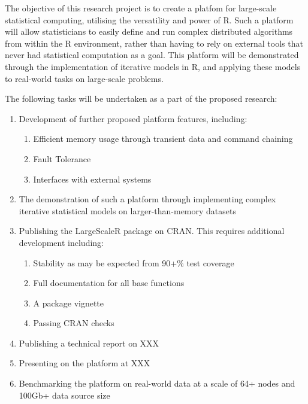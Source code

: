 The objective of this research project is to create a platfom for large-scale statistical computing, utilising the versatility and power of R.
Such a platform will allow statisticians to easily define and run complex distributed algorithms from within the R environment, rather than having to rely on external tools that never had statistical computation as a goal.
This platform will be demonstrated through the implementation of iterative models in R, and applying these models to real-world tasks on large-scale problems.

The following tasks will be undertaken as a part of the proposed research:

\begin{enumerate}
        \item Development of further proposed platform features, including:
                \begin{enumerate}
                        \item Efficient memory usage through transient data and command chaining
                        \item Fault Tolerance
                        \item Interfaces with external systems
                \end{enumerate}
        \item The demonstration of such a platform through implementing complex iterative statistical models on larger-than-memory datasets
        \item Publishing the LargeScaleR package on CRAN. This requires additional development including:
                \begin{enumerate}
                        \item Stability as may be expected from 90+\% test coverage
                        \item Full documentation for all base functions
                        \item A package vignette
                        \item Passing CRAN checks
                \end{enumerate}
        \item Publishing a technical report on XXX
        \item Presenting on the platform at XXX
        \item Benchmarking the platform on real-world data at a scale of 64+ nodes and 100Gb+ data source size
\end{enumerate}
